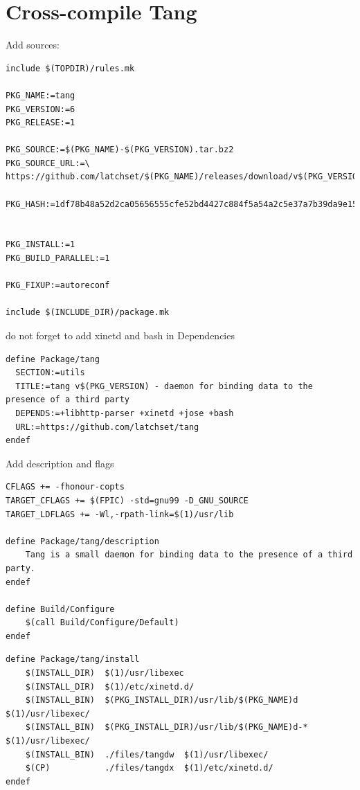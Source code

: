 \section{Cross-compile Tang}
Add sources:
\begin{lstlisting}[columns=fixed,basicstyle=\ttfamily\footnotesize,tabsize=4,backgroundcolor=\color{yellow!10}]
include $(TOPDIR)/rules.mk

PKG_NAME:=tang
PKG_VERSION:=6
PKG_RELEASE:=1

PKG_SOURCE:=$(PKG_NAME)-$(PKG_VERSION).tar.bz2
PKG_SOURCE_URL:=\
https://github.com/latchset/$(PKG_NAME)/releases/download/v$(PKG_VERSION)/

PKG_HASH:=1df78b48a52d2ca05656555cfe52bd4427c884f5a54a2c5e37a7b39da9e155e3


PKG_INSTALL:=1
PKG_BUILD_PARALLEL:=1

PKG_FIXUP:=autoreconf

include $(INCLUDE_DIR)/package.mk
\end{lstlisting}

do not forget to add xinetd and bash in Dependencies

\begin{lstlisting}[columns=fixed,basicstyle=\ttfamily\footnotesize,tabsize=4,backgroundcolor=\color{yellow!10}]
define Package/tang
  SECTION:=utils
  TITLE:=tang v$(PKG_VERSION) - daemon for binding data to the presence of a third party
  DEPENDS:=+libhttp-parser +xinetd +jose +bash
  URL:=https://github.com/latchset/tang
endef
\end{lstlisting}

Add description and flags

\begin{lstlisting}[columns=fixed,basicstyle=\ttfamily\footnotesize,tabsize=4,backgroundcolor=\color{yellow!10}]
CFLAGS += -fhonour-copts
TARGET_CFLAGS += $(FPIC) -std=gnu99 -D_GNU_SOURCE
TARGET_LDFLAGS += -Wl,-rpath-link=$(1)/usr/lib

define Package/tang/description
	Tang is a small daemon for binding data to the presence of a third party.
endef

define Build/Configure
	$(call Build/Configure/Default)
endef
\end{lstlisting}


\begin{lstlisting}[columns=fixed,basicstyle=\ttfamily\footnotesize,tabsize=4,backgroundcolor=\color{yellow!10}]
define Package/tang/install
	$(INSTALL_DIR)	$(1)/usr/libexec
	$(INSTALL_DIR)	$(1)/etc/xinetd.d/
	$(INSTALL_BIN)	$(PKG_INSTALL_DIR)/usr/lib/$(PKG_NAME)d		$(1)/usr/libexec/
	$(INSTALL_BIN)	$(PKG_INSTALL_DIR)/usr/lib/$(PKG_NAME)d-*	$(1)/usr/libexec/
	$(INSTALL_BIN)	./files/tangdw	$(1)/usr/libexec/
	$(CP)			./files/tangdx	$(1)/etc/xinetd.d/
endef
\end{lstlisting}



